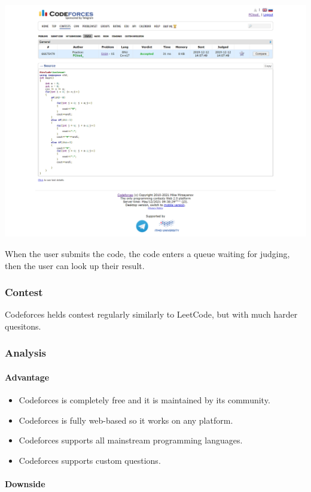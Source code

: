 \documentclass[a4paper]{report}
\begin{document}
\includegraphics[width=\linewidth]{Submission-66675479-Codeforces}

When the user submits the code, the code enters a queue waiting for judging, then the user can look up their result.

\subsubsection{Contest}

Codeforces helds contest regularly similarly to LeetCode, but with much harder quesitons.

\subsubsection{Analysis}

\paragraph{Advantage}

\begin{itemize}
    \item Codeforces is completely free and it is maintained by its community.
    \item Codeforces is fully web-based so it works on any platform.
    \item Codeforces supports all mainstream programming languages.
    \item Codeforces supports custom questions.
\end{itemize}

\paragraph{Downside}
\end{document}
